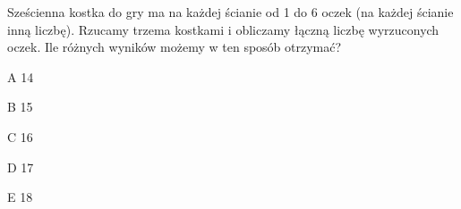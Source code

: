\begin{tresc}
Sześcienna kostka do gry ma na każdej ścianie od 1 do 6 oczek (na każdej ścianie inną liczbę). Rzucamy trzema kostkami i obliczamy łączną liczbę wyrzuconych oczek. Ile różnych wyników możemy w ten sposób otrzymać?
\end{tresc}
\begin{wariant}{A} 14 \end{wariant}
\begin{wariant}{B} 15 \end{wariant}
\begin{wariant}{C} 16 \end{wariant}
\begin{wariant}{D} 17 \end{wariant}
\begin{wariant}{E} 18 \end{wariant}
